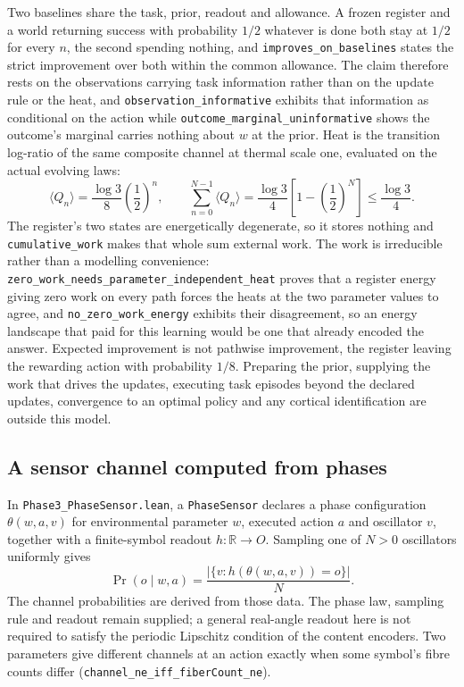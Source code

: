 \documentclass{article}
\begin{document}
Two baselines share the task, prior, readout and allowance. A frozen register
and a world returning success with probability $1/2$ whatever is done both stay
at $1/2$ for every $n$, the second spending nothing, and
\nolinkurl{improves_on_baselines} states the strict
improvement over both within the common allowance. The claim therefore rests on
the observations carrying task information rather than on the update rule or
the heat, and \nolinkurl{observation_informative} exhibits that
information as conditional on the action while
\nolinkurl{outcome_marginal_uninformative} shows the
outcome's marginal carries nothing about $w$ at the prior. Heat is the
transition log-ratio of the same composite channel at thermal scale one,
evaluated on the actual evolving laws:
\begin{equation}
 \langle Q_n\rangle=\frac{\log3}{8}\left(\frac12\right)^n,\qquad
 \sum_{n=0}^{N-1}\langle Q_n\rangle=\frac{\log3}{4}
 \left[1-\left(\frac12\right)^N\right]\leq\frac{\log3}{4}.
 \label{eq:observational-heat}
\end{equation}
The register's two states are energetically degenerate, so it stores nothing
and \nolinkurl{cumulative_work} makes that whole sum external work.
The work is irreducible rather than a modelling convenience:
\nolinkurl{zero_work_needs_parameter_independent_heat}
proves that a register energy giving zero work on every path forces the heats
at the two parameter values to agree, and
\nolinkurl{no_zero_work_energy} exhibits
their disagreement, so an energy landscape that paid for this learning would be
one that already encoded the answer. Expected improvement is not pathwise
improvement, the register leaving the rewarding action with probability $1/8$.
Preparing the prior, supplying the work that drives the updates, executing task
episodes beyond the declared updates, convergence to an optimal policy and any
cortical identification are outside this model.

\subsection{A sensor channel computed from phases}
\label{sec:supp-phase-sensor}

In \nolinkurl{Phase3_PhaseSensor.lean}, a \texttt{PhaseSensor}
declares a phase configuration $\theta(w,a,v)$ for environmental parameter $w$,
executed action $a$ and oscillator $v$, together with a finite-symbol readout
$h:\mathbb{R}\to O$. Sampling one of $N>0$ oscillators uniformly gives
\begin{equation}
 \Pr(o\mid w,a)=\frac{|\{v:h(\theta(w,a,v))=o\}|}{N}.
 \label{eq:phase-sensor-channel}
\end{equation}
The channel probabilities are derived from those data. The phase law, sampling
rule and readout remain supplied; a general real-angle readout here is not
required to satisfy the periodic Lipschitz condition of the content encoders.
Two parameters give different channels at an action exactly when some symbol's
fibre counts differ
(\nolinkurl{channel_ne_iff_fiberCount_ne}).
\end{document}
